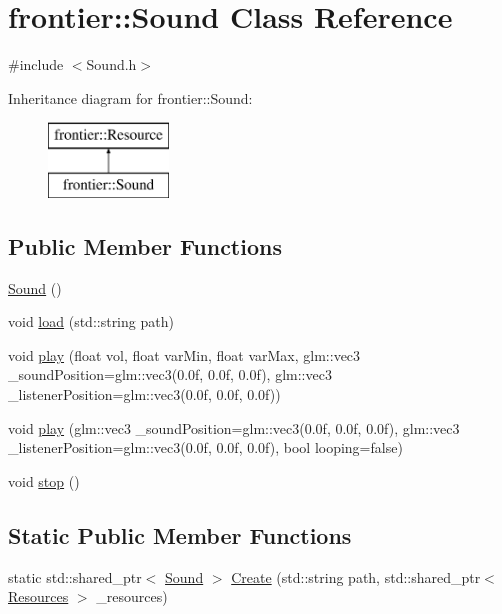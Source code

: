 \hypertarget{classfrontier_1_1_sound}{}\section{frontier\+:\+:Sound Class Reference}
\label{classfrontier_1_1_sound}


{\ttfamily \#include $<$Sound.\+h$>$}

Inheritance diagram for frontier\+:\+:Sound\+:\begin{figure}[H]
\begin{center}
\leavevmode
\includegraphics[height=2.000000cm]{classfrontier_1_1_sound}
\end{center}
\end{figure}
\subsection*{Public Member Functions}
\begin{DoxyCompactItemize}
\item 
\hyperlink{classfrontier_1_1_sound_ab0940b4b5e83737b071a4334c2a7850c}{Sound} ()
\item 
void \hyperlink{classfrontier_1_1_sound_ac175fd9a053e4126ccfb3b5e008e059d}{load} (std\+::string path)
\item 
void \hyperlink{classfrontier_1_1_sound_af16c7e18be028f8ecde1423d19b7216d}{play} (float vol, float var\+Min, float var\+Max, glm\+::vec3 \+\_\+sound\+Position=glm\+::vec3(0.\+0f, 0.\+0f, 0.\+0f), glm\+::vec3 \+\_\+listener\+Position=glm\+::vec3(0.\+0f, 0.\+0f, 0.\+0f))
\item 
void \hyperlink{classfrontier_1_1_sound_ad46b70e56c1425a08e0658032c841dbd}{play} (glm\+::vec3 \+\_\+sound\+Position=glm\+::vec3(0.\+0f, 0.\+0f, 0.\+0f), glm\+::vec3 \+\_\+listener\+Position=glm\+::vec3(0.\+0f, 0.\+0f, 0.\+0f), bool looping=false)
\item 
void \hyperlink{classfrontier_1_1_sound_a29249749885a1bdeff05d120df153207}{stop} ()
\end{DoxyCompactItemize}
\subsection*{Static Public Member Functions}
\begin{DoxyCompactItemize}
\item 
static std\+::shared\+\_\+ptr$<$ \hyperlink{classfrontier_1_1_sound}{Sound} $>$ \hyperlink{classfrontier_1_1_sound_ab605185af084b415e84a1eac043c7fb7}{Create} (std\+::string path, std\+::shared\+\_\+ptr$<$ \hyperlink{classfrontier_1_1_resources}{Resources} $>$ \+\_\+resources)
\end{DoxyCompactItemize}
